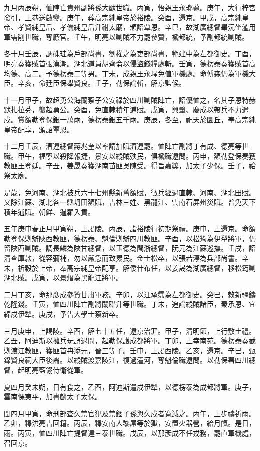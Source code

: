 \begin{pinyinscope}
九月丙辰朔，恤陣亡貴州副將孫大猷世職。丙寅，怡親王永瑯薨。庚午，大行梓宮發引，上恭送啟鑾。庚午，葬高宗純皇帝於裕陵。癸酉，還京。甲戌，高宗純皇帝、孝賢純皇后、孝儀純皇后升祔太廟，頒詔覃恩。辛巳，故湖廣總督畢沅坐濫用軍需削世職，奪廕官。壬午，明亮以剿賊不力罷參贊，褫都統，予副都統剿賊。

冬十月壬辰，調硃珪為戶部尚書，劉權之為吏部尚書，範建中為左都御史。丁酉，明亮奏獲賊首張漢潮。湖北道員胡齊侖以侵盜錢糧處斬。壬寅，德楞泰奏獲賊首高均德、高二。予德楞泰二等男。丁未，成親王永瑆免值軍機處。命傅森仍為軍機大臣。辛亥，命廷臣保舉賢良。壬子，勒保論斬，解京監候。

十一月甲子，故超勇公海蘭察子公安祿於四川剿賊陣亡，詔優恤之，名其子恩特赫默扎拉芬，襲超勇公。癸酉，免直隸積年逋賦。戊寅，興肇、慶成以帶兵不力遣戍。賞額勒登保銀一萬兩，德楞泰銀五千兩。庚辰，冬至，祀天於圜丘，奉高宗純皇帝配享，頒詔覃恩。

十二月壬辰，漕運總督蔣兆奎以率請加賦濟運罷。恤陣亡副將丁有成、德亮等世職。甲午，福寧以殺降報捷，景安以縱賊殃民，俱褫職逮問。丙申，額勒登保奏獲教匪王登廷。辛丑，姜晟奏獲湖南苗匪吳陳受。得旨嘉獎，加太子少保。壬子，祫祭太廟。

是歲，免河南、湖北被兵六十七州縣新舊額賦，徵兵經過直隸、河南、湖北田賦。又除江蘇、湖北各一縣坍田額賦，吉林三姓、黑龍江、雲南石屏州災賦。普免天下積年逋賦。朝鮮、暹羅入貢。

五午庚申春正月甲寅朔，上謁陵。丙辰，詣裕陵行初期祭禮。庚申，上還京。命額勒登保剿辦陜西教匪，德楞泰、魁倫剿辦四川教匪。辛酉，以松筠為伊犁將軍，仍留陜西剿賊。調長麟為陜甘總督，以玉德為閩浙總督，阮元為江蘇巡撫。壬戌，詔清查庫款，從容彌補，勿以嚴急而致累民。金士松卒，以張若渟為兵部尚書。辛未，祈穀於上帝，奉高宗純皇帝配享。解倭什布任，以姜晟為湖廣總督，移松筠剿湖北賊。戊寅，以景熠為黑龍江將軍。

二月丁亥，命那彥成參贊甘肅軍務。辛卯，以汪承霈為左都御史。癸巳，敕新疆鑄乾隆錢。壬寅，恤四川陣亡副將關聯升等世職。丁未，追論縱賊諸臣，秦承恩、宜綿戍伊犁。庚戌，予告大學士蔡新卒。

三月庚申，上謁陵。辛酉，解七十五任，逮京治罪。甲子，清明節，上行敷土禮。乙丑，阿迪斯以擁兵玩誤逮問，起勒保護成都將軍。丁卯，上幸南苑。德楞泰奏截剿渡江教匪，獲匪首冉添元，晉三等子。壬申，上謁西陵。乙亥，還京。辛巳，甄錄賢良祠大臣後裔。以縱賊渡嘉陵江，復過潼河，奪魁倫職逮問。以勒保署四川總督，起明亮藍翎侍衛從軍。

夏四月癸未朔，日有食之，乙酉，阿迪斯遣戍伊犁，以德楞泰為成都將軍。庚子，雲南惈夷平，加書麟太子太保。

閏四月甲寅，命刑部查久禁官犯及禁錮子孫與久戍者寬減之。丙午，上步禱祈雨。乙卯，釋洪亮吉回籍。丙辰，釋安南人黎屌等於獄，安置火器營，給月餼。是日，雨。丙寅，恤四川陣亡提督達三泰世職。戊辰，以那彥成不任戎務，罷直軍機處，召回京。


\end{pinyinscope}

